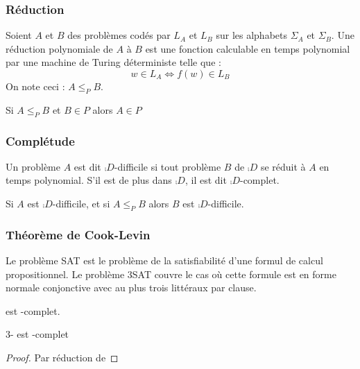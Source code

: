 \documentclass{cours}
\begin{document}
\subsubsection{Réduction}
\begin{definition}
    Soient $A$ et $B$ des problèmes codés par $L_{A}$ et $L_{B}$ sur les alphabets $\Sigma_{A}$ et $\Sigma_{B}$. Une réduction polynomiale de $A$ à $B$ est une fonction calculable en temps polynomial par une machine de Turing déterministe telle que : 
    \[
        w \in L_{A} \Leftrightarrow f(w) \in L_{B}
    \]
    On note ceci : $A \leq_{P} B$.
\end{definition}

\begin{proposition}
    Si $A \leq_{P} B$ et $B \in P$ alors $A\in P$ 
\end{proposition}

\subsubsection{Complétude}
\begin{definition}
    Un problème $A$ est dit $\comp{D}$-difficile si tout problème $B$ de $\comp{D}$ se réduit à $A$ en temps polynomial. S'il est de plus dans $\comp{D}$, il est dit $\comp{D}$-complet.
\end{definition}

\begin{proposition}
    Si $A$ est $\comp{D}$-difficile, et si $A \leq_{P} B$ alors $B$ est $\comp{D}$-difficile. 
\end{proposition}


\subsubsection{Théorème de Cook-Levin}
\begin{definition}
    Le problème SAT est le problème de la satisfiabilité d'une formul de calcul propositionnel. Le problème 3SAT couvre le cas où cette formule est en forme normale conjonctive avec au plus trois littéraux par clause. 
\end{definition}

\begin{theorem}\label{thm:cook}
     est -complet. 
\end{theorem}

\begin{theorem}
    $3$- est -complet
\end{theorem}
\begin{proof}
    Par réduction de 
\end{proof}
\end{document}
